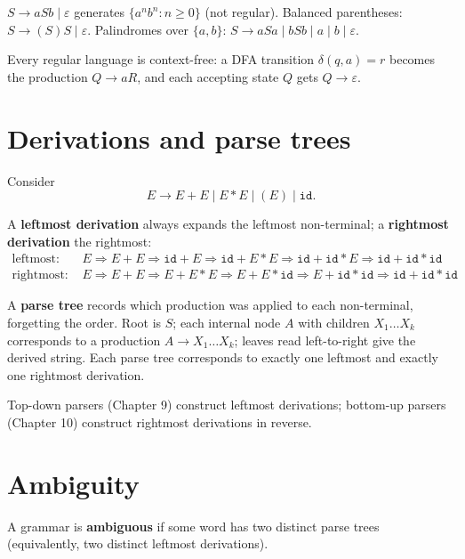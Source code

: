 \begin{example}
$S \to aSb \mid \varepsilon$ generates $\{a^nb^n : n\ge 0\}$ (not regular).
Balanced parentheses: $S \to (S)S \mid \varepsilon$.
Palindromes over $\{a,b\}$: $S \to aSa \mid bSb \mid a \mid b \mid \varepsilon$.
\end{example}

Every regular language is context-free: a DFA transition $\delta(q,a)=r$ becomes the
production $Q \to aR$, and each accepting state $Q$ gets $Q \to \varepsilon$.

\section{Derivations and parse trees}

Consider
\[
  E \to E + E \mid E * E \mid (E) \mid \mathtt{id}.
\]

A \textbf{leftmost derivation} always expands the leftmost non-terminal; a
\textbf{rightmost derivation} the rightmost:
\begin{align*}
\text{leftmost: } & E \Rightarrow E + E \Rightarrow \mathtt{id} + E \Rightarrow
  \mathtt{id} + E * E \Rightarrow \mathtt{id}+\mathtt{id}*E \Rightarrow \mathtt{id}+\mathtt{id}*\mathtt{id} \\
\text{rightmost: } & E \Rightarrow E + E \Rightarrow E + E * E \Rightarrow
  E + E * \mathtt{id} \Rightarrow E+\mathtt{id}*\mathtt{id} \Rightarrow \mathtt{id}+\mathtt{id}*\mathtt{id}
\end{align*}

A \textbf{parse tree} records which production was applied to each non-terminal, forgetting
the order. Root is $S$; each internal node $A$ with children $X_1\dots X_k$ corresponds to a
production $A\to X_1\dots X_k$; leaves read left-to-right give the derived string. Each parse
tree corresponds to exactly one leftmost and exactly one rightmost derivation.

Top-down parsers (Chapter 9) construct leftmost derivations; bottom-up parsers (Chapter 10)
construct rightmost derivations in reverse.

\section{Ambiguity}

\begin{definition}
A grammar is \textbf{ambiguous} if some word has two distinct parse trees (equivalently,
two distinct leftmost derivations).
\end{definition}

